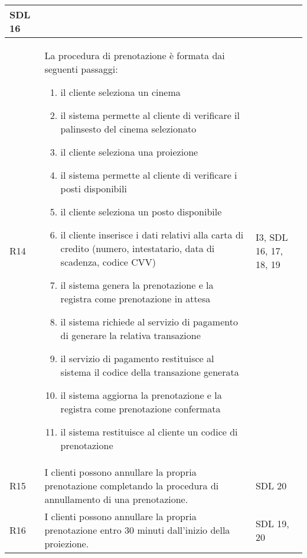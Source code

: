 \begin{longtable}{|p{0.8cm}|p{13.4cm}|p{2.1cm}|}
      SDL 16
      \\\hline
      R14                                                                     &
      La procedura di prenotazione è formata dai seguenti passaggi:
      \begin{enumerate}
            \item il cliente seleziona un cinema
            \item il sistema permette al cliente di verificare
                  il palinsesto del cinema selezionato
            \item il cliente seleziona una proiezione
            \item il sistema permette al cliente di verificare
                  i posti disponibili
            \item il cliente seleziona un posto disponibile
            \item il cliente inserisce i dati relativi alla carta
                  di credito (numero, intestatario, data di scadenza,
                  codice CVV)
            \item il sistema genera la prenotazione e la registra
                  come prenotazione in attesa
            \item il sistema richiede al servizio di pagamento di
                  generare la relativa transazione
            \item il servizio di pagamento restituisce al sistema
                  il codice della transazione generata
            \item il sistema aggiorna la prenotazione e la registra
                  come prenotazione confermata
            \item il sistema restituisce al cliente un codice di
                  prenotazione
      \end{enumerate}                   &
      I3, SDL 16, 17, 18, 19
      \\\hline
      R15                                                                     &
      I clienti possono annullare la propria prenotazione completando la
      procedura di annullamento di una prenotazione.                          &
      SDL 20
      \\\hline
      R16                                                                     &
      I clienti possono annullare la propria prenotazione entro 30 minuti
      dall'inizio della proiezione.                                           &
      SDL 19, 20
      \\\hline

\end{longtable}
